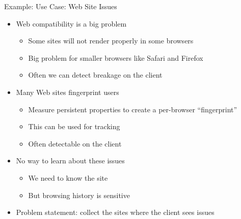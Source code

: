 \documentclass[helvetica]{beamer}
\begin{document}
\begin{frame}{Example: Use Case: Web Site Issues}

  \begin{itemize}
  \item Web compatibility is a big problem
    \begin{itemize}
    \item Some sites will not render properly in some browsers
    \item Big problem for smaller browsers like Safari and Firefox
    \item Often we can detect breakage on the client      
    \end{itemize}
    
  \item Many Web sites fingerprint users
    \begin{itemize}
    \item Measure persistent properties to create a per-browser ``fingerprint''
    \item This can be used for tracking
    \item Often detectable on the client
    \end{itemize}

  \item No way to learn about these issues
    \begin{itemize}
    \item We need to know the site
    \item But browsing history is sensitive      
    \end{itemize}

  \item Problem statement: collect the sites where the client sees issues
  \end{itemize}
\end{frame}
\end{document}
